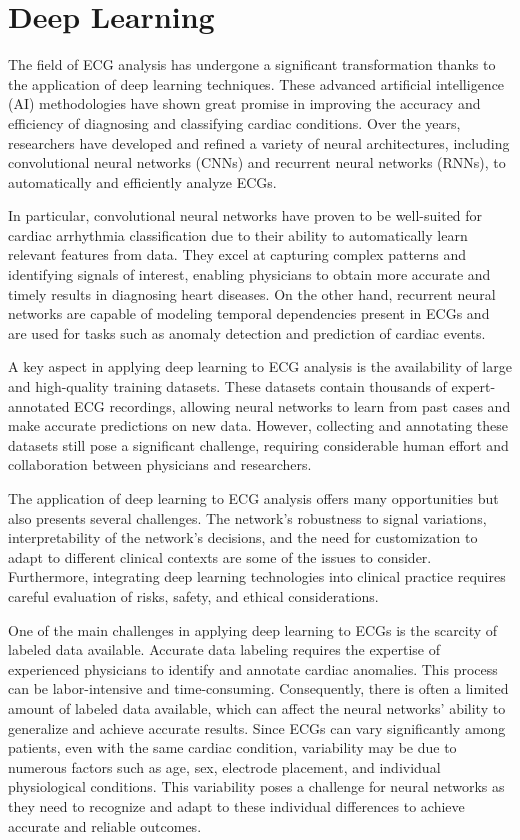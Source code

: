 \documentclass[12pt,english]{report}
\begin{document}
\section{Deep Learning}
\label{sec:deep}

The field of ECG analysis has undergone a significant transformation thanks to the application of deep learning techniques. These advanced artificial intelligence (AI) methodologies have shown great promise in improving the accuracy and efficiency of diagnosing and classifying cardiac conditions. Over the years, researchers have developed and refined a variety of neural architectures, including convolutional neural networks (CNNs) and recurrent neural networks (RNNs), to automatically and efficiently analyze ECGs.

In particular, convolutional neural networks have proven to be well-suited for cardiac arrhythmia classification due to their ability to automatically learn relevant features from data. They excel at capturing complex patterns and identifying signals of interest, enabling physicians to obtain more accurate and timely results in diagnosing heart diseases. On the other hand, recurrent neural networks are capable of modeling temporal dependencies present in ECGs and are used for tasks such as anomaly detection and prediction of cardiac events.

A key aspect in applying deep learning to ECG analysis is the availability of large and high-quality training datasets. These datasets contain thousands of expert-annotated ECG recordings, allowing neural networks to learn from past cases and make accurate predictions on new data. However, collecting and annotating these datasets still pose a significant challenge, requiring considerable human effort and collaboration between physicians and researchers.

The application of deep learning to ECG analysis offers many opportunities but also presents several challenges. The network's robustness to signal variations, interpretability of the network's decisions, and the need for customization to adapt to different clinical contexts are some of the issues to consider. Furthermore, integrating deep learning technologies into clinical practice requires careful evaluation of risks, safety, and ethical considerations.

One of the main challenges in applying deep learning to ECGs is the scarcity of labeled data available. Accurate data labeling requires the expertise of experienced physicians to identify and annotate cardiac anomalies. This process can be labor-intensive and time-consuming. Consequently, there is often a limited amount of labeled data available, which can affect the neural networks' ability to generalize and achieve accurate results. Since ECGs can vary significantly among patients, even with the same cardiac condition, variability may be due to numerous factors such as age, sex, electrode placement, and individual physiological conditions. This variability poses a challenge for neural networks as they need to recognize and adapt to these individual differences to achieve accurate and reliable outcomes.
\end{document}
